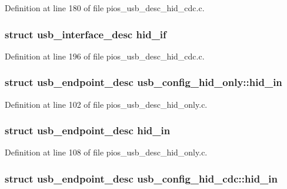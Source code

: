 \-Definition at line 180 of file pios\-\_\-usb\-\_\-desc\-\_\-hid\-\_\-cdc.\-c.

\hypertarget{group___p_i_o_s___u_s_b___d_e_s_c_ga66dd41530dc7e219cf377870362857ce}{
\subsubsection[{hid\-\_\-if}]{\setlength{\rightskip}{0pt plus 5cm}struct {\bf usb\-\_\-interface\-\_\-desc} {\bf hid\-\_\-if}}}\label{group___p_i_o_s___u_s_b___d_e_s_c_ga66dd41530dc7e219cf377870362857ce}


\-Definition at line 196 of file pios\-\_\-usb\-\_\-desc\-\_\-hid\-\_\-cdc.\-c.

\hypertarget{group___p_i_o_s___u_s_b___d_e_s_c_gac0401b402235f315c995eb13de1425ec}{
\subsubsection[{hid\-\_\-in}]{\setlength{\rightskip}{0pt plus 5cm}struct {\bf usb\-\_\-endpoint\-\_\-desc} {\bf usb\-\_\-config\-\_\-hid\-\_\-only\-::hid\-\_\-in}}}\label{group___p_i_o_s___u_s_b___d_e_s_c_gac0401b402235f315c995eb13de1425ec}


\-Definition at line 102 of file pios\-\_\-usb\-\_\-desc\-\_\-hid\-\_\-only.\-c.

\hypertarget{group___p_i_o_s___u_s_b___d_e_s_c_gad74809997499537622da0aaac4d1c3da}{
\subsubsection[{hid\-\_\-in}]{\setlength{\rightskip}{0pt plus 5cm}struct {\bf usb\-\_\-endpoint\-\_\-desc} {\bf hid\-\_\-in}}}\label{group___p_i_o_s___u_s_b___d_e_s_c_gad74809997499537622da0aaac4d1c3da}


\-Definition at line 108 of file pios\-\_\-usb\-\_\-desc\-\_\-hid\-\_\-only.\-c.

\hypertarget{group___p_i_o_s___u_s_b___d_e_s_c_gaf6d4567d3dfbf3397c5842bdef4e13c8}{
\subsubsection[{hid\-\_\-in}]{\setlength{\rightskip}{0pt plus 5cm}struct {\bf usb\-\_\-endpoint\-\_\-desc} {\bf usb\-\_\-config\-\_\-hid\-\_\-cdc\-::hid\-\_\-in}}}\label{group___p_i_o_s___u_s_b___d_e_s_c_gaf6d4567d3dfbf3397c5842bdef4e13c8}


